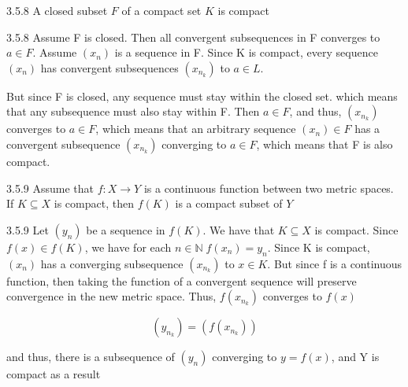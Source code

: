 \documentclass[a4paper,norsk]{article}
\begin{document}
\begin{propositionbox}{3.5.8}{}
A closed subset $ F $ of a compact set $ K $ is compact

\begin{proofbox}{3.5.8}{}
  Assume F is closed. Then all convergent subsequences in F converges to $ a \in F $. Assume $ \left( x_n \right)  $ is a sequence in F. Since K is compact, every sequence $ \left( x_n \right)  $ has convergent subsequences $ \left( x_{n_k} \right)  $ to $ a \in L $. 

  But since F is closed, any sequence must stay within the closed set. which means that any subsequence must also stay within F. Then $ a \in F $, and thus, $ \left( x_{n_k} \right)  $  converges to $ a \in F $, which means that an arbitrary sequence $ \left( x_n \right) \in F  $ has a convergent subsequence $ \left( x_{n_k} \right)  $ converging to $ a \in F $, which means that F is also compact. 
\end{proofbox}
\end{propositionbox}

\begin{propositionbox}{3.5.9}{}
Assume that $ f : X \to Y $ is a continuous function between two metric spaces. If $ K \subseteq X $ is compact, then $ f \left( K \right)  $ is a compact subset of $ Y $ 

\begin{proofbox}{3.5.9}{}
  Let $ \left( y_n \right)  $ be a sequence in $ f \left( K \right)$. We have that $ K \subseteq X $  is compact. Since $ f(x) \in f \left( K \right)  $, we have for each $ n \in \mathbb{N} \; f \left( x_n \right) = y_n$. Since K is compact, $ \left( x_n \right)  $ has a converging subsequence $ \left( x_{n_k} \right)  $  to $ x \in K $. But since f is a continuous function, then taking the function of a convergent sequence will preserve convergence in the new metric space. Thus, $ f \left( x_{n_k} \right)  $ converges to $ f \left( x \right)  $

  \[
      \left( y_{n_k} \right) = \left( f \left( x_{n_k} \right)  \right) 
  \]

  and thus, there is a subsequence of $ \left( y_n \right)  $ converging to $ y = f(x) $, and Y is compact as a result
  
\end{proofbox}
\end{propositionbox}
\end{document}
